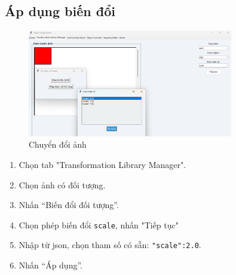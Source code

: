 \documentclass[a4paper,12pt]{article}
\begin{document}
\subsection{Áp dụng biến đổi}
\begin{figure}[H]
    \centering
    \includegraphics[width=0.8\textwidth]{Tranform.png}
    \caption{Chuyển đổi ảnh}
    \label{fig:tlm_tab}
    \end{figure}
\begin{enumerate}
    \item Chọn tab "Transformation Library Manager".
    \item Chọn ảnh có đối tượng.
    \item Nhấn “Biến đổi đối tượng”.
    \item Chọn phép biến đổi \texttt{scale}, nhấn "Tiếp tục"
    \item Nhập từ json, chọn tham số có sẵn: \texttt{{"scale":2.0}}.
    \item Nhấn “Áp dụng”.
\end{enumerate}
\end{document}
